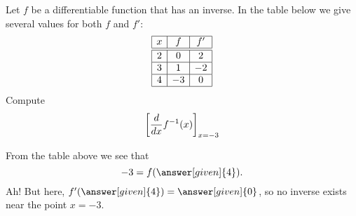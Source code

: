 \documentclass{ximera}
\begin{document}
\begin{example}
  Let $f$ be a differentiable function that has an inverse. In the
  table below we give several values for both $f$ and $f'$:
  \[
  \begin{array}{|c|c|c|}\hline
    x & f  & f' \\ \hline \hline
    2 & 0  & 2  \\ \hline
    3 & 1  & -2 \\ \hline
    4 & -3 & 0  \\ \hline
  \end{array}
  \]
  Compute
  \[
  \bigg[ \frac{d}{dx} f^{-1}(x) \bigg]_{x=-3}
  \]
  \begin{explanation}
    From the table above we see that
    \[
    -3 = f(\answer[given]{4}).
    \]
    Ah! But here, $f'(\answer[given]{4}) = \answer[given]{0}$, so no
    inverse exists near the point $x=-3$.
      \end{explanation}
\end{example}
\end{document}
